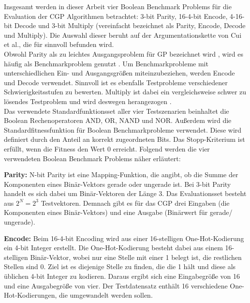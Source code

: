 Insgesamt werden in dieser Arbeit vier Boolean Benchmark Problems für die Evaluation der CGP Algorithmen betrachtet: 3-bit Parity, 16-4-bit Encode, 4-16-bit Decode und 3-bit Multiply (vereinfacht bezeichnet als Parity, Encode, Decode und Multiply).
Die Auswahl dieser beruht auf der Argumentationskette von Cui et al., die für sinnvoll befunden wird. \cite{cui_equidistant_2023}\\
Obwohl Parity als zu leichtes Ausgangsproblem für GP bezeichnet wird \cite{white_better_2013}, wird es häufig als Benchmarkproblem genutzt \cite{yu_neutrality_2001, kaufmann_kalkreuth_2017, kaufmann_kalkreuth_2020}.
Um Benchmarkprobleme mit unterschiedlichen Ein- und Ausgangsgrößen miteinzubeziehen, werden Encode und Decode verwendet.
Sinnvoll ist es ebenfalls Testprobleme verschiedener Schwierigkeitsstufen zu bewerten.
Multiply ist dabei ein vergleichsweise schwer zu lösendes Testproblem und wird deswegen herangezogen \cite{walker_2008}.\\

Das verwendete Standardfunktionsset aller vier Testszenarien beinhaltet die Boolean Rechenoperatoren AND, OR, NAND und NOR.
Außerdem wird die Standardfitnessfunktion für Boolean Benchmarkprobleme verwendet.
Diese wird definiert durch den Anteil an korrekt zugeordneten Bits. \cite{cui_equidistant_2023}
Das Stopp-Kriterium ist erfüllt, wenn die Fitness den Wert 0 erreicht.
Folgend werden die vier verwendeten Boolean Benchmark Problems näher erläutert:

\textbf{Parity:} N-bit Parity ist eine Mapping-Funktion, die angibt, ob die Summe der Komponenten eines Binär-Vektors gerade oder ungerade ist.
Bei 3-bit Parity handelt es sich dabei um Binär-Vektoren der Länge 3.
Das Evaluationsset besteht aus $2^N=2^3$ Testvektoren. \cite{hohil_1999}
Demnach gibt es für das CGP drei Eingaben (die Komponenten eines Binär-Vektors) und eine Ausgabe (Binärwert für \glqq gerade\grqq\space / \glqq ungerade\grqq).

\textbf{Encode:} Beim 16-4-bit Encoding wird aus einer 16-stelligen One-Hot-Kodierung ein 4-bit Integer erstellt.
Die One-Hot-Kodierung besteht dabei aus einem 16-stelligen Binär-Vektor, wobei nur eine Stelle mit einer 1 belegt ist, die restlichen Stellen sind 0.
Ziel ist es diejenige Stelle zu finden, die die 1 hält und diese als üblichen 4-bit Integer zu kodieren. \cite{cui_weighted_mutation, goldman_2015}
Daraus ergibt sich eine Eingabegröße von 16 und eine Ausgabegröße von vier.
Der Testdatensatz enthält 16 verschiedene One-Hot-Kodierungen, die umgewandelt werden sollen.

